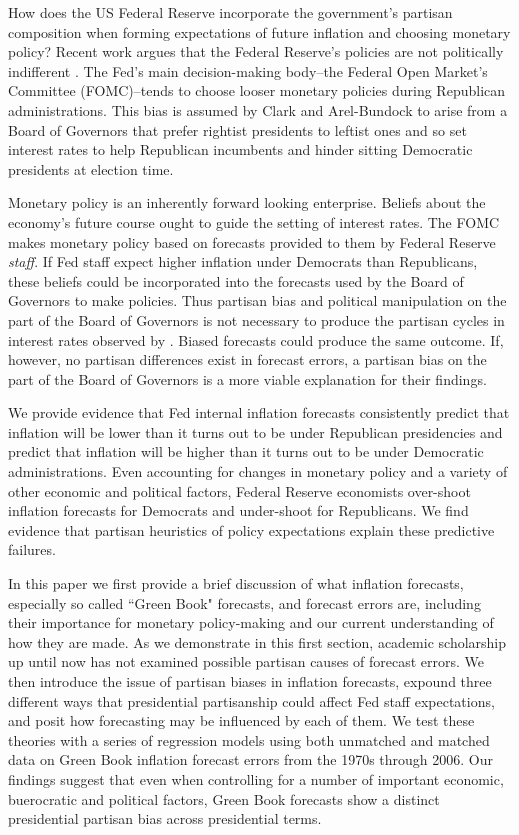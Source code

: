 \documentclass[a4paper]{article}\usepackage{graphicx, color}
\begin{document}
How does the US Federal Reserve incorporate the government's partisan composition when forming expectations of future inflation and choosing monetary policy? Recent work argues that the Federal Reserve's policies are not politically indifferent \citep{Clark2012}. The Fed's main decision-making body--the Federal Open Market's Committee (FOMC)--tends to choose looser monetary policies during Republican administrations. This bias is assumed by Clark and Arel-Bundock to arise from a Board of Governors that prefer rightist presidents to leftist ones and so set interest rates to help Republican incumbents and hinder sitting Democratic presidents at election time. 

Monetary policy is an inherently forward looking enterprise. Beliefs about the economy's future course ought to guide the setting of interest rates. The FOMC makes monetary policy based on forecasts provided to them by Federal Reserve \emph{staff}. If Fed staff expect higher inflation under Democrats than Republicans, these beliefs could be incorporated into the forecasts used by the Board of Governors to make policies. Thus partisan bias and political manipulation on the part of the Board of Governors is not necessary to produce the partisan cycles in interest rates observed by \cite{Clark2012}. Biased forecasts could produce the same outcome. If, however, no partisan differences exist in forecast errors, a partisan bias on the part of the Board of Governors is a more viable explanation for their findings.

We provide evidence that Fed internal inflation forecasts consistently predict that inflation will be lower than it turns out to be under Republican presidencies and predict that inflation will be higher than it turns out to be under Democratic administrations. Even accounting for changes in monetary policy and a variety of other economic and political factors, Federal Reserve economists over-shoot inflation forecasts for Democrats and under-shoot for Republicans. We find evidence that partisan heuristics of policy expectations explain these predictive failures.

In this paper we first provide a brief discussion of what inflation forecasts, especially so called ``Green Book" forecasts, and forecast errors are, including their importance for monetary policy-making and our current understanding of how they are made. As we demonstrate in this first section, academic scholarship up until now has not examined possible partisan causes of forecast errors. We then introduce the issue of partisan biases in inflation forecasts, expound three different ways that presidential partisanship could affect Fed staff expectations, and posit how forecasting may be influenced by each of them. We test these theories with a series of regression models using both unmatched and matched data on Green Book inflation forecast errors from the 1970s through 2006. Our findings suggest that even when controlling for a number of important economic, buerocratic and political factors, Green Book forecasts show a distinct presidential partisan bias across presidential terms. 
\end{document}
